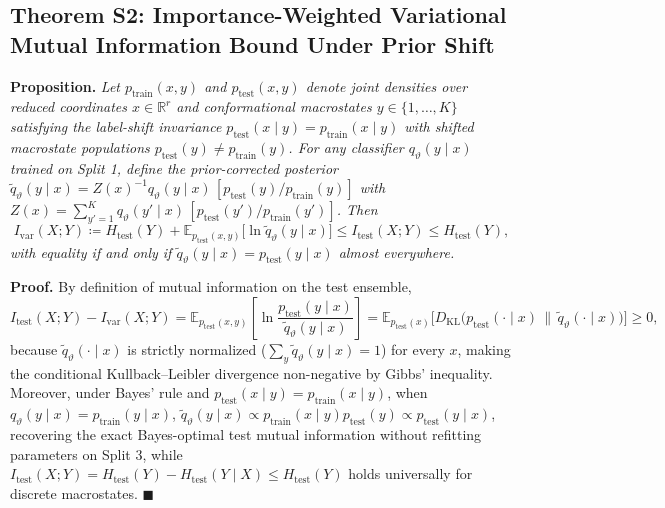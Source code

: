 \documentclass[10pt,letterpaper]{article}
\begin{document}
\subsection{Theorem S2: Importance-Weighted Variational Mutual Information Bound Under Prior Shift}
\textbf{Proposition.} \textit{Let $p_{\mathrm{train}}(x,y)$ and $p_{\mathrm{test}}(x,y)$ denote joint densities over reduced coordinates $x \in \mathbb{R}^r$ and conformational macrostates $y \in \{1,\dots,K\}$ satisfying the label-shift invariance $p_{\mathrm{test}}(x\mid y) = p_{\mathrm{train}}(x\mid y)$ with shifted macrostate populations $p_{\mathrm{test}}(y) \ne p_{\mathrm{train}}(y)$. For any classifier $q_\vartheta(y\mid x)$ trained on Split 1, define the prior-corrected posterior $\tilde{q}_\vartheta(y\mid x) = Z(x)^{-1} q_\vartheta(y\mid x)\,[p_{\mathrm{test}}(y)/p_{\mathrm{train}}(y)]$ with $Z(x) = \sum_{y'=1}^K q_\vartheta(y'\mid x)\,[p_{\mathrm{test}}(y')/p_{\mathrm{train}}(y')]$. Then}
\[
I_{\mathrm{var}}(X;Y) \coloneqq H_{\mathrm{test}}(Y) + \mathbb{E}_{p_{\mathrm{test}}(x,y)}\!\big[\ln \tilde{q}_\vartheta(y\mid x)\big] \le I_{\mathrm{test}}(X;Y) \le H_{\mathrm{test}}(Y),
\]
\textit{with equality if and only if $\tilde{q}_\vartheta(y\mid x) = p_{\mathrm{test}}(y\mid x)$ almost everywhere.}

\textbf{Proof.} By definition of mutual information on the test ensemble,
\[
I_{\mathrm{test}}(X;Y) - I_{\mathrm{var}}(X;Y) = \mathbb{E}_{p_{\mathrm{test}}(x,y)}\!\left[\ln\frac{p_{\mathrm{test}}(y\mid x)}{\tilde{q}_\vartheta(y\mid x)}\right] = \mathbb{E}_{p_{\mathrm{test}}(x)}\!\Big[D_{\mathrm{KL}}\!\big(p_{\mathrm{test}}(\cdot\mid x)\,\big\|\,\tilde{q}_\vartheta(\cdot\mid x)\big)\Big] \ge 0,
\]
because $\tilde{q}_\vartheta(\cdot\mid x)$ is strictly normalized ($\sum_y \tilde{q}_\vartheta(y\mid x) = 1$) for every $x$, making the conditional Kullback--Leibler divergence non-negative by Gibbs' inequality. Moreover, under Bayes' rule and $p_{\mathrm{test}}(x\mid y) = p_{\mathrm{train}}(x\mid y)$, when $q_\vartheta(y\mid x) = p_{\mathrm{train}}(y\mid x)$, $\tilde{q}_\vartheta(y\mid x) \propto p_{\mathrm{train}}(x\mid y)p_{\mathrm{test}}(y) \propto p_{\mathrm{test}}(y\mid x)$, recovering the exact Bayes-optimal test mutual information without refitting parameters on Split 3, while $I_{\mathrm{test}}(X;Y) = H_{\mathrm{test}}(Y) - H_{\mathrm{test}}(Y\mid X) \le H_{\mathrm{test}}(Y)$ holds universally for discrete macrostates. $\blacksquare$
\end{document}
